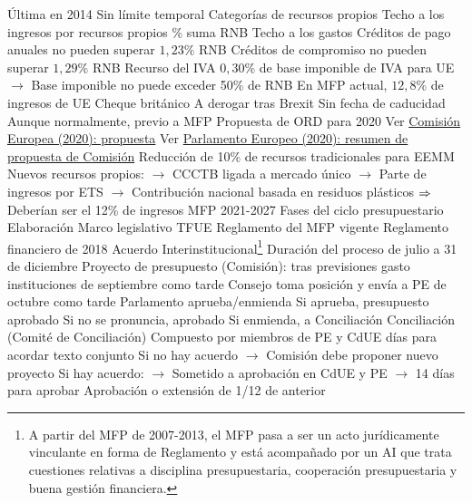 \documentclass{nuevotema}
\begin{document}
\begin{esquemal}
				\4 Última en 2014
				\4[] Sin límite temporal
				\4 Categorías de recursos propios
				\4 Techo a los ingresos por recursos propios
				\4[] \% suma RNB
				\4 Techo a los gastos
				\4[] Créditos de pago anuales no pueden superar $1,23\%$ RNB
				\4[] Créditos de compromiso no pueden superar $1,29\%$ RNB
				\4 Recurso del IVA
				\4[] $0,30\%$ de base imponible de IVA para UE
				\4[] $\to$ Base imponible no puede exceder 50\% de RNB
				\4[] En MFP actual, $12,8\%$ de ingresos de UE
				\4 Cheque británico
				\4[] A derogar tras Brexit
				\4 Sin fecha de caducidad
				\4[] Aunque normalmente, previo a MFP
				\4 Propuesta de ORD para 2020
				\4[] Ver \href{https://ec.europa.eu/info/sites/info/files/about_the_european_commission/eu_budget/com_2020_445_en_act_v8.pdf}{Comisión Europea (2020): propuesta}
				\4[] Ver \href{https://www.europarl.europa.eu/legislative-train/theme-new-boost-for-jobs-growth-and-investment/file-mff-post-2020-own-resources}{Parlamento Europeo (2020): resumen de propuesta de Comisión}
				\4[] Reducción de 10\% de recursos tradicionales para EEMM
				\4[] Nuevos recursos propios:
				\4[] $\to$ CCCTB ligada a mercado único
				\4[] $\to$ Parte de ingresos por ETS
				\4[] $\to$ Contribución nacional basada en residuos plásticos
				\4[] $\Rightarrow$ Deberían ser el 12\% de ingresos MFP 2021-2027
		\2 Fases del ciclo presupuestario
			\3 Elaboración
				\4 Marco legislativo
				\4[] TFUE
				\4[] Reglamento del MFP vigente
				\4[] Reglamento financiero de 2018
				\4[] Acuerdo Interinstitucional\footnote{A partir del MFP de 2007-2013, el MFP pasa a ser un acto jurídicamente vinculante en forma de Reglamento y está acompañado por un AI que trata cuestiones relativas a disciplina presupuestaria, cooperación presupuestaria y buena gestión financiera.}
				\4 Duración del proceso
				 de julio a 31 de diciembre
				\4[1.] Proyecto de presupuesto (Comisión):
				\4[] tras previsiones gasto instituciones
				 de septiembre como tarde
				\4[2.] Consejo toma posición y envía a PE
				 de octubre como tarde
				\4[3.] Parlamento aprueba/enmienda
				\4[] Si aprueba, presupuesto aprobado
				\4[] Si no se pronuncia, aprobado
				\4[] Si enmienda, a Conciliación
				\4[4.] Conciliación (Comité de Conciliación)
				\4[] Compuesto por miembros de PE y CdUE
				 días para acordar texto conjunto
				\4[] Si no hay acuerdo
				\4[] $\to$ Comisión debe proponer nuevo proyecto
				\4[] Si hay acuerdo:
				\4[] $\to$ Sometido a aprobación en CdUE y PE
				\4[] $\to$ 14 días para aprobar
				\4[5.] Aprobación o extensión de 1/12 de anterior

\end{esquemal}
\end{document}
